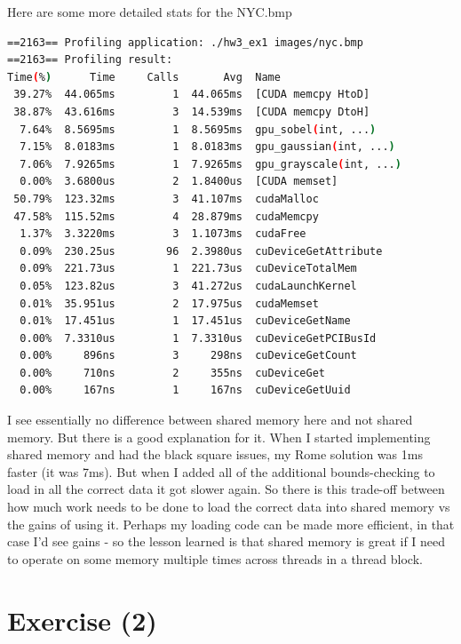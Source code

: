 \documentclass{article}
\begin{document}
Here are some more detailed stats for the NYC.bmp

\begin{mdframed}[backgroundcolor=codeColor,leftmargin=0.0cm,hidealllines=true,%
  innerleftmargin=0.1cm,innerrightmargin=0.1cm,innertopmargin=0.5cm,innerbottommargin=0.10cm,
  roundcorner=15pt]
\begin{lstlisting}[language=bash]
==2163== Profiling application: ./hw3_ex1 images/nyc.bmp
==2163== Profiling result:
Time(%)      Time     Calls       Avg  Name
 39.27%  44.065ms         1  44.065ms  [CUDA memcpy HtoD]
 38.87%  43.616ms         3  14.539ms  [CUDA memcpy DtoH]
  7.64%  8.5695ms         1  8.5695ms  gpu_sobel(int, ...)
  7.15%  8.0183ms         1  8.0183ms  gpu_gaussian(int, ...)
  7.06%  7.9265ms         1  7.9265ms  gpu_grayscale(int, ...)
  0.00%  3.6800us         2  1.8400us  [CUDA memset]
 50.79%  123.32ms         3  41.107ms  cudaMalloc
 47.58%  115.52ms         4  28.879ms  cudaMemcpy
  1.37%  3.3220ms         3  1.1073ms  cudaFree
  0.09%  230.25us        96  2.3980us  cuDeviceGetAttribute
  0.09%  221.73us         1  221.73us  cuDeviceTotalMem
  0.05%  123.82us         3  41.272us  cudaLaunchKernel
  0.01%  35.951us         2  17.975us  cudaMemset
  0.01%  17.451us         1  17.451us  cuDeviceGetName
  0.00%  7.3310us         1  7.3310us  cuDeviceGetPCIBusId
  0.00%     896ns         3     298ns  cuDeviceGetCount
  0.00%     710ns         2     355ns  cuDeviceGet
  0.00%     167ns         1     167ns  cuDeviceGetUuid
\end{lstlisting}
\end{mdframed}


I see essentially no difference between shared memory here and not shared memory. But there is a good explanation for it. When I started implementing shared memory and had the black square issues, my Rome solution was 1ms
faster (it was 7ms). But when I added all of the additional bounds-checking to load in all the correct data it got slower again. So there is this trade-off between how much work needs to be done to load the correct data into
shared memory vs the gains of using it. Perhaps my loading code can be made more efficient, in that case I'd see gains - so the lesson learned is that shared memory is great if I need to operate on some memory multiple times
across threads in a thread block.

\section{Exercise (2)}%
\label{sec:exercise_2_}
\end{document}
